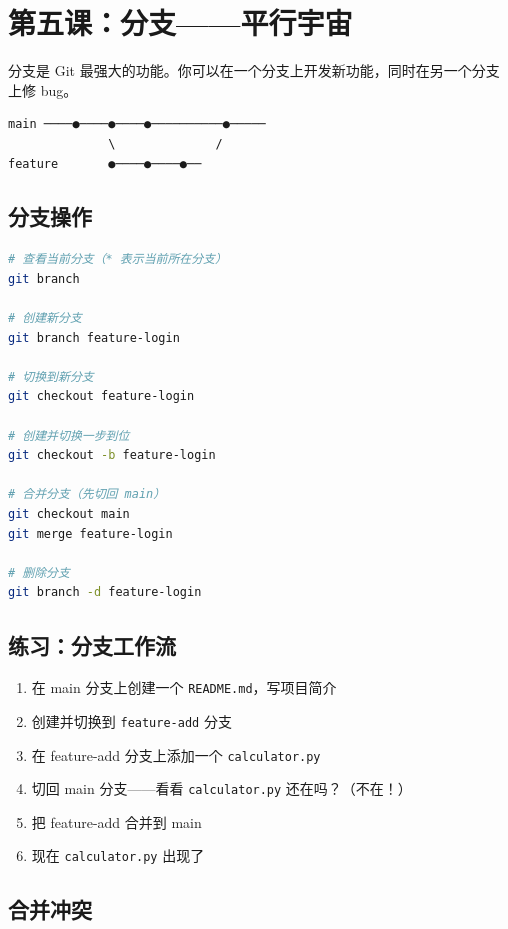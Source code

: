 \documentclass[a4paper,12pt]{ctexart}
\begin{document}
\section*{第五课：分支——平行宇宙}

分支是 Git 最强大的功能。你可以在一个分支上开发新功能，同时在另一个分支上修 bug。

\begin{verbatim}
main ────●────●────●──────────●─────
              \              /
feature       ●────●────●──
\end{verbatim}

\subsection*{分支操作}

\begin{lstlisting}[language=bash]
# 查看当前分支（* 表示当前所在分支）
git branch

# 创建新分支
git branch feature-login

# 切换到新分支
git checkout feature-login

# 创建并切换一步到位
git checkout -b feature-login

# 合并分支（先切回 main）
git checkout main
git merge feature-login

# 删除分支
git branch -d feature-login
\end{lstlisting}

\subsection*{练习：分支工作流}

\begin{enumerate}
  \item 在 main 分支上创建一个 \texttt{README.md}，写项目简介
  \item 创建并切换到 \texttt{feature-add} 分支
  \item 在 feature-add 分支上添加一个 \texttt{calculator.py}
  \item 切回 main 分支——看看 \texttt{calculator.py} 还在吗？（不在！）
  \item 把 feature-add 合并到 main
  \item 现在 \texttt{calculator.py} 出现了
\end{enumerate}

\subsection*{合并冲突}
\end{document}
